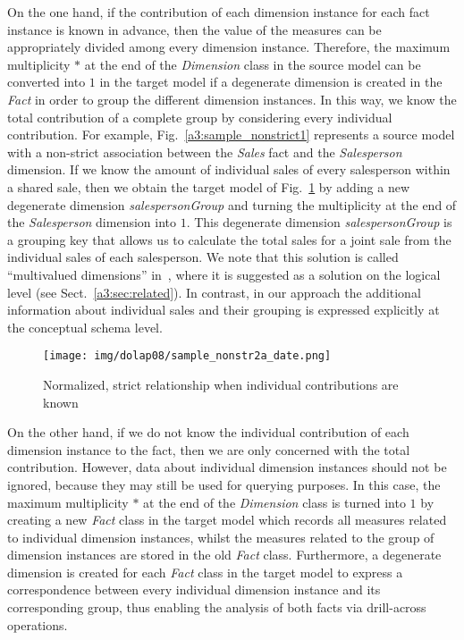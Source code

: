 On the one hand, if the contribution of each dimension instance for
each fact instance is known in advance, then the value of the
measures can be appropriately divided among every dimension
instance. Therefore, the maximum multiplicity $*$ at the end of the
\emph{Dimension} class in the source model can be converted into $1$
in the target model if a degenerate dimension is created in the
\emph{Fact} in order to group the different dimension instances. In
this way, we know the total contribution of a complete group by
considering every individual contribution. For example,
Fig.~\ref{a3:sample_nonstrict1} represents a source model with a
non-strict association between the \emph{Sales} fact and the
\emph{Salesperson} dimension. If we know the amount of individual
sales of every salesperson within a shared sale, then we obtain the
target model of Fig.~\ref{a3:sample_nonstrict2a} by adding a new
degenerate dimension \emph{salespersonGroup} and turning the
multiplicity at the end of the \emph{Salesperson} dimension into
$1$. This degenerate dimension \emph{salespersonGroup} is a grouping
key that allows us to calculate the total sales for a joint sale
from the individual sales of each salesperson.  We note that this
solution is called ``multivalued dimensions''
in~\cite{book/Kimball/DW}, where it is suggested as a solution on
the logical level (see Sect.~\ref{a3:sec:related}). In contrast, in
our approach the additional information about individual sales and
their grouping is expressed explicitly at the conceptual schema
level.

\begin{figure}
\begin{center}
\texttt{[image: img/dolap08/sample\_nonstr2a\_date.png]}
\end{center}
\caption{Normalized, strict relationship when individual
contributions are known} \label{a3:sample_nonstrict2a}
\end{figure}

On the other hand, if we do not know the individual contribution of
each dimension instance to the fact, then we are only concerned with
the total contribution. However, data about individual dimension
instances should not be ignored, because they may still be used for
querying purposes. In this case, the maximum multiplicity $*$ at the
end of the \emph{Dimension} class is turned into $1$  by creating a
new \emph{Fact} class in the target model which records all measures
related to individual dimension instances, whilst the measures
related to the group of dimension instances are stored in the old
\emph{Fact} class. Furthermore, a degenerate dimension is created
for each \emph{Fact} class in the target model to express a
correspondence between every individual dimension instance and its
corresponding group, thus enabling the analysis of both facts via
drill-across operations.

